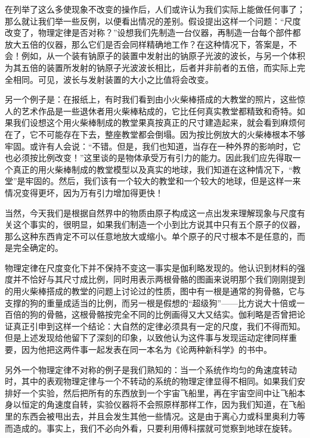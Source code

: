 在列举了这么多使现象不改变的操作后，人们或许认为我们实际上能做任何事了；那么就让我们举一些反例，以便看出情况的差别。假设提出这样一个问题：“尺度改变了，物理定律是否对称？”设想我们先制造一台仪器，再制造一台每个部件都放大五倍的仪器，那么它们是否会同样精确地工作？在这种情况下，答案是，不会！例如，从一个装有钠原子的装置中发射出的钠原子光波的波长，与另一个体积为其五倍的装置所发射的钠原子光波波长相比，后者并非前者的五倍，而实际上完全相同。可见，波长与发射装置的大小之比值将会改变。

另一个例子是：在报纸上，有时我们看到由小火柴棒搭成的大教堂的照片，这些惊人的艺术作品是一些退休者用火柴棒粘成的，它比任何真实教堂都精致和奇特。如果我们设想这个用火柴棒制成的教堂果真按真正的尺寸建造起来，就会看到麻烦何在了，它不可能存在下去，整座教堂都会倒塌。因为按比例放大的火柴棒根本不够牢固。或许有人会说：“不错。但是，我们也知道，当存在一种外界的影响时，它也必须按比例改变！”这里谈的是物体承受万有引力的能力。因此我们应先得取一个真正的用火柴棒制成的教堂模型以及真实的地球，我们知道在这种情况下，“教堂”是牢固的。然后，我们该有一个较大的教堂和一个较大的地球，但是这样一来情况变得更坏，因为万有引力增加得更快！

当然，今天我们是根据自然界中的物质由原子构成这一点出发来理解现象与尺度有关这个事实的，很明显，如果我们制造一个小到比方说其中只有五个原子的仪器，那么这种东西肯定不可以任意地放大或缩小。单个原子的尺寸根本不是任意的，而是完全确定的。

物理定律在尺度变化下并不保持不变这一事实是伽利略发现的。他认识到材料的强度并不恰好与其尺寸成比例，同时用表示两根骨骼的图画来说明那个我们刚刚提到的用火柴棒搭成的教堂的问题上讨论过的性质，图中有一根是通常的狗骨骼，它与支撑的狗的重量成适当的比例，而另一根是假想的“超级狗”——比方说大十倍或一百倍的狗的骨骼，这根骨骼按完全不同的比例画得又大又结实。伽利略是否曾把论证真正引申到这样一个结论：大自然的定律必须具有一定的尺度，我们不得而知。但是上述发现给他留下了深刻的印象，以致他认为这件事与发现运动定律同样重要，因为他把这两件事一起发表在同一本名为《论两种新科学》的书中。

另外一个物理定律不对称的例子是我们熟知的：当一个系统作均匀的角速度转动时，其中的表观物理定律与一个不转动的系统的物理定律显得不相同。如果我们安排好一个实验，然后把所有的东西放到一个宇宙飞船里，再在宇宙空间中让飞船本身以恒定的角速度自转，实验仪器将不会照原样那样工作，因为我们知道，在飞船里的东西会被甩出去，并且会发生其他一些情况。这是由于离心力或科里奥利力等而造成的。事实上，我们不必向外看，只要利用傅科摆就可觉察到地球在旋转。

